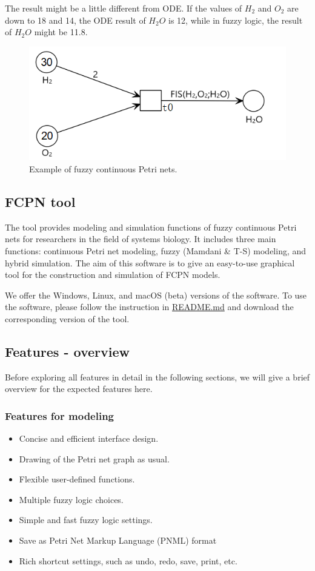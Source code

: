 \documentclass[journal,a4paper,onecolumn]{article}
\begin{document}
The result might be a little different from ODE. If the values of $H_2$ and $O_2$ are down to 18 and 14, the ODE result of $H_2O$ is 12, while in fuzzy logic, the result of $H_2O$ might be 11.8. 
\begin{figure}[!hbt]
	\begin{center}
		\includegraphics[width=0.5\columnwidth]{fig50}
		\caption{Example of fuzzy continuous Petri nets.}
		\label{fig:Example of fuzzy continuous Petri nets}
	\end{center}
\end{figure}


\subsection{FCPN tool}

The tool provides modeling and simulation functions of fuzzy continuous Petri nets for researchers in the field of systems biology.
It includes three main functions: continuous Petri net modeling, fuzzy (Mamdani \& T-S) modeling, and hybrid simulation. 
The aim of this software is to give an easy-to-use graphical tool for the construction and simulation of FCPN models.

We offer the Windows, Linux, and macOS (beta) versions of the software. To use the software, please follow the instruction in \href{https://github.com/liufei2016/fcpn/blob/master/README.md}{README.md} and download the corresponding version of the tool.


\subsection{Features - overview}
Before exploring all features in detail in the following sections, we will give a brief overview for the expected features here.

\subsubsection{Features for modeling}
\begin{itemize}
	\item Concise and efficient interface design.
	\item Drawing of the Petri net graph as usual.
	\item Flexible user-defined functions.
	\item Multiple fuzzy logic choices.
	\item Simple and fast fuzzy logic settings.
	\item Save as Petri Net Markup Language (PNML) format
	\item Rich shortcut settings, such as undo, redo, save, print, etc.
\end{itemize}
\end{document}
